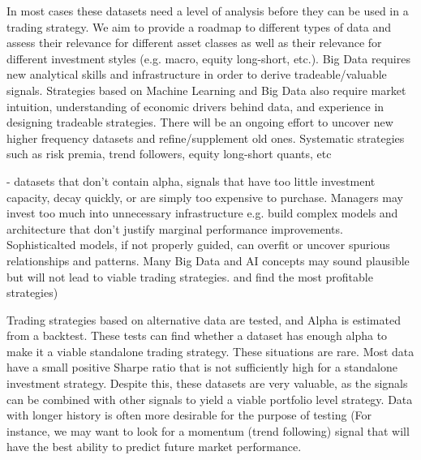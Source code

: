 \documentclass[a4paper]{article}
\begin{document}

 In most cases these datasets need a level of analysis
before they can be used in a trading strategy. We aim to provide a roadmap to different types of data and assess their
relevance for different asset classes as well as their relevance for different investment styles (e.g. macro, equity long-short,
etc.). Big Data requires new analytical skills and
infrastructure in order to derive tradeable/valuable signals. Strategies based on Machine Learning and Big Data also require market
intuition, understanding of economic drivers behind data, and experience in designing tradeable strategies. There will be an ongoing
effort to uncover new higher frequency datasets and refine/supplement old ones. Systematic strategies such as risk
premia, trend followers, equity long-short quants, etc

- datasets that don’t contain alpha, signals that have too little
investment capacity, decay quickly, or are simply too expensive to purchase. Managers may invest too much into
unnecessary infrastructure e.g. build complex models and architecture that don’t justify marginal performance
improvements. Sophisticalted models, if not properly
guided, can overfit or uncover spurious relationships and patterns.  Many Big Data and AI
concepts may sound plausible but will not lead to viable trading strategies.  and find the most profitable
strategies)

Trading strategies based on alternative data are tested, and Alpha is estimated from a backtest. These tests can find
whether a dataset has enough alpha to make it a viable standalone trading strategy. These situations are rare. Most data
have a small positive Sharpe ratio that is not sufficiently high for a standalone investment strategy. Despite this, these
datasets are very valuable, as the signals can be combined with other signals to yield a viable portfolio level strategy.  Data with longer history is often
more desirable for the purpose of testing (For instance, we may want to look for a momentum
(trend following) signal that will have the best ability to predict future market performance. 
\end{document}
